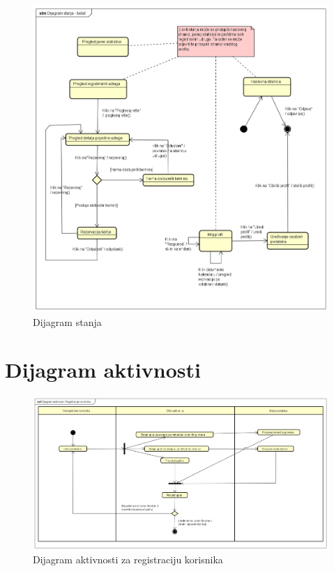     \begin{figure}[H]
    			    \includegraphics[scale=0.45]{dijagrami/Dijagram_stanja-setac.png}
    			    \centering
    			    \caption{Dijagram stanja}
    			    \label{fig:states}
		    \end{figure}
			
		
			\eject 
		
		\section{Dijagram aktivnosti}
			
			\begin{figure}[H]
			\includegraphics[scale=0.3]{dijagrami/Dijagram_aktivnosti-Registracija_korisnika.png}
			\centering
			\caption{Dijagram aktivnosti za registraciju korisnika}
			\label{fig:activity_diagram_1}
		\end{figure}	

